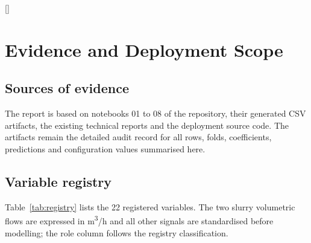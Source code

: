   [\vspace{1pt}{\color{OcpGreen}\titlerule[1.4pt]}]
\chapter{Evidence and Deployment Scope}\label{app:evidence}
\section{Sources of evidence}
The report is based on notebooks 01 to 08 of the repository, their generated CSV artifacts, the existing technical reports and the deployment source code. The artifacts remain the detailed audit record for all rows, folds, coefficients, predictions and configuration values summarised here.

\section{Variable registry}
Table~\ref{tab:registry} lists the 22 registered variables. The two slurry volumetric flows are expressed in m\textsuperscript{3}/h and all other signals are standardised before modelling; the role column follows the registry classification.

